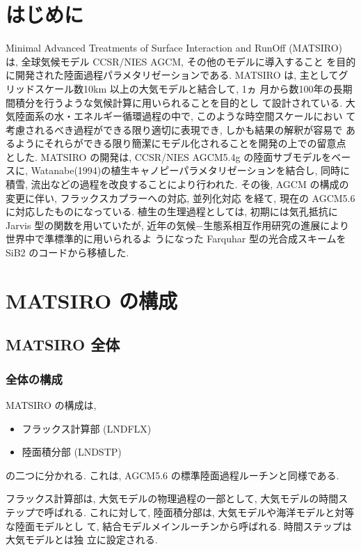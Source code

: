 \section{はじめに}
Minimal Advanced Treatments of Surface Interaction and RunOff
(MATSIRO) は, 全球気候モデル CCSR/NIES AGCM, その他のモデルに導入すること
を目的に開発された陸面過程パラメタリゼーションである.
MATSIRO は, 主としてグリッドスケール数10km 以上の大気モデルと結合して, 1ヵ
月から数100年の長期間積分を行うような気候計算に用いられることを目的とし
て設計されている.
大気陸面系の水・エネルギー循環過程の中で, このような時空間スケールにおい
て考慮されるべき過程ができる限り適切に表現でき, しかも結果の解釈が容易で
あるようにそれらができる限り簡潔にモデル化されることを開発の上での留意点
とした.
MATSIRO の開発は, CCSR/NIES AGCM5.4g の陸面サブモデルをベースに,
Watanabe(1994)の植生キャノピーパラメタリゼーションを結合し, 同時に積雪,
流出などの過程を改良することにより行われた.
その後, AGCM の構成の変更に伴い, フラックスカプラーへの対応, 並列化対応
を経て, 現在の AGCM5.6 に対応したものになっている.
植生の生理過程としては, 初期には気孔抵抗に Jarvis 型の関数を用いていたが,
近年の気候−生態系相互作用研究の進展により世界中で準標準的に用いられるよ
うになった Farquhar 型の光合成スキームを SiB2 のコードから移植した.

\section{MATSIRO の構成}

\subsection{MATSIRO 全体}

\subsubsection{全体の構成}

MATSIRO の構成は,
\begin{itemize}
\item フラックス計算部 (LNDFLX)
\item 陸面積分部 (LNDSTP)
\end{itemize}
の二つに分かれる.
これは, AGCM5.6 の標準陸面過程ルーチンと同様である.

フラックス計算部は, 大気モデルの物理過程の一部として, 大気モデルの時間ス
テップで呼ばれる.
これに対して, 陸面積分部は, 大気モデルや海洋モデルと対等な陸面モデルとし
て, 結合モデルメインルーチンから呼ばれる. 時間ステップは大気モデルとは独
立に設定される.

